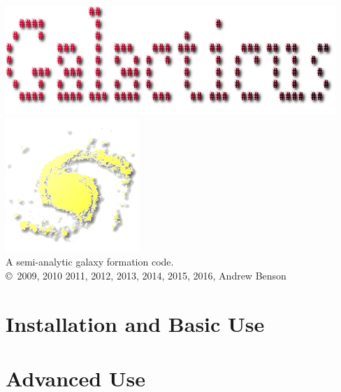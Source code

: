 \documentclass[letterpaper,10pt,headsepline]{scrbook}
\begin{document}
\lstset{language=[95]Fortran}

\frontmatter

\pagestyle{empty}
\begin{center}
\includegraphics[width=125mm]{GalacticusLogo.png}\\

\includegraphics{New_Logo_Galaxy_192_Transparent.png}\\
A semi-analytic galaxy formation code.\\

\copyright\ 2009, 2010 2011, 2012, 2013, 2014, 2015, 2016, Andrew Benson
\end{center}

\tableofcontents

\mainmatter
\pagestyle{headings}

\part{Installation and Basic Use}



















\part{Advanced Use}
\end{document}
